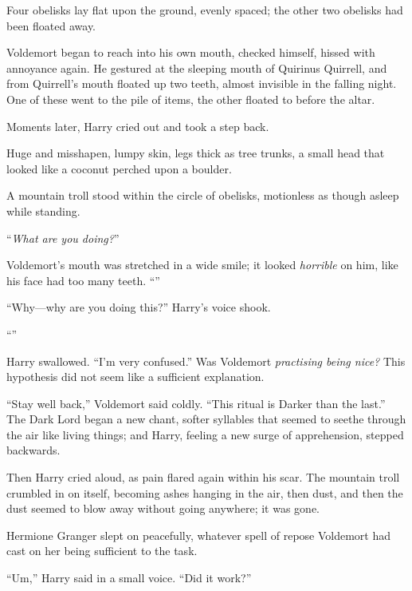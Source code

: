 Four obelisks lay flat upon the ground, evenly spaced; the other two obelisks had been floated away.

Voldemort began to reach into his own mouth, checked himself, hissed with annoyance again. He gestured at the sleeping mouth of Quirinus Quirrell, and from Quirrell’s mouth floated up two teeth, almost invisible in the falling night. One of these went to the pile of items, the other floated to before the altar.

Moments later, Harry cried out and took a step back.

Huge and misshapen, lumpy skin, legs thick as tree trunks, a small head that looked like a coconut perched upon a boulder.

A mountain troll stood within the circle of obelisks, motionless as though asleep while standing.

“\emph{What are you doing?}”

Voldemort’s mouth was stretched in a wide smile; it looked \emph{horrible} on him, like his face had too many teeth. “”

“Why—why are you doing this?” Harry’s voice shook.

“”

Harry swallowed. “I’m very confused.” Was Voldemort \emph{practising being nice?} This hypothesis did not seem like a sufficient explanation.

“Stay well back,” Voldemort said coldly. “This ritual is Darker than the last.” The Dark Lord began a new chant, softer syllables that seemed to seethe through the air like living things; and Harry, feeling a new surge of apprehension, stepped backwards.

Then Harry cried aloud, as pain flared again within his scar. The mountain troll crumbled in on itself, becoming ashes hanging in the air, then dust, and then the dust seemed to blow away without going anywhere; it was gone.

Hermione Granger slept on peacefully, whatever spell of repose Voldemort had cast on her being sufficient to the task.

“Um,” Harry said in a small voice. “Did it work?”

